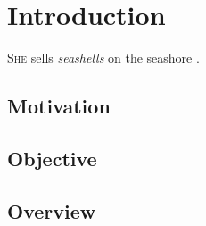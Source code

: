 \chapter{Introduction}

\textsc{She} sells \emph{seashells} on the seashore \cite{goodfellow2016}.

\section{Motivation}
\lipsum[1]

\section{Objective}
\lipsum[1]

\section{Overview}
\lipsum[1]

